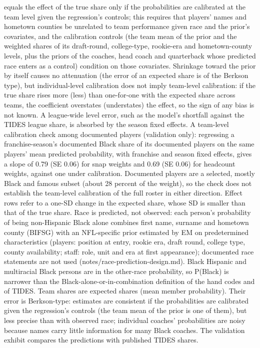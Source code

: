 {equals the effect of the true share only if the probabilities are calibrated at the team level given the regression's controls; this requires that players' names and hometown counties be unrelated to team performance given race and the prior's covariates, and the calibration controls (the team mean of the prior and the weighted shares of its draft-round, college-type, rookie-era and hometown-county levels, plus the priors of the coaches, head coach and quarterback whose predicted race enters as a control) condition on those covariates. Shrinkage toward the prior by itself causes no attenuation (the error of an expected share is of the Berkson type), but individual-level calibration does not imply team-level calibration: if the true share rises more (less) than one-for-one with the expected share across teams, the coefficient overstates (understates) the effect, so the sign of any bias is not known. A league-wide level error, such as the model's shortfall against the TIDES league share, is absorbed by the season fixed effects. A team-level calibration check among documented players (validation only): regressing a franchise-season's documented Black share of its documented players on the same players' mean predicted probability, with franchise and season fixed effects, gives a slope of 0.79 (SE 0.06) for snap weights and  0.69 (SE 0.06) for headcount weights, against one under calibration. Documented players are a selected, mostly Black and famous subset (about 28 percent of the weight), so the check does not establish the team-level calibration of the full roster in either direction. Effect rows refer to a one-SD change in the expected share, whose SD is smaller than that of the true share. Race is predicted, not observed: each person's probability of being non-Hispanic Black alone combines first name, surname and hometown county (BIFSG) with an NFL-specific prior estimated by EM on predetermined characteristics (players: position at entry, rookie era, draft round, college type, county availability; staff: role, unit and era at first appearance); documented race statements are not used (notes/race-prediction-design.md). Black Hispanic and multiracial Black persons are in the other-race probability, so P(Black) is narrower than the Black-alone-or-in-combination definition of the hand codes and of TIDES. Team shares are expected shares (mean member probability). Their error is Berkson-type: estimates are consistent if the probabilities are calibrated given the regression's controls (the team mean of the prior is one of them), but less precise than with observed race; individual coaches' probabilities are noisy because names carry little information for many Black coaches. The validation exhibit compares the predictions with published TIDES shares.
\par}

